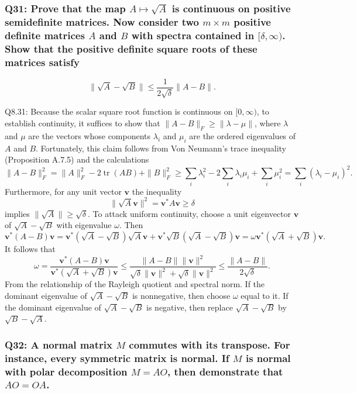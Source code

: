 \documentclass[8pt]{article}
\begin{document}
{\subsubsection*{Q31: Prove that the map \(A \mapsto \sqrt{A}\) is continuous on positive semidefinite matrices. Now consider two \(m \times m\) positive definite matrices \(A\) and \(B\) with spectra contained in \([\delta, \infty)\). Show that the positive definite square roots of these matrices satisfy}

\[ \| \sqrt{A} - \sqrt{B} \| \leq \frac{1}{2\sqrt{\delta}} \| A - B \|. \]

Q8.31: Because the scalar square root function is continuous on \([0, \infty)\), to establish continuity, it suffices to show that \(\|A - B\|_F \geq \|\lambda - \mu\|\), where \(\lambda\) and \(\mu\) are the vectors whose components \(\lambda_i\) and \(\mu_i\) are the ordered eigenvalues of \(A\) and \(B\). Fortunately, this claim follows from Von Neumann’s trace inequality (Proposition A.7.5) and the calculations
\[
\|A - B\|_F^2 = \|A\|_F^2 - 2 \operatorname{tr}(AB) + \|B\|_F^2 \geq \sum_i \lambda_i^2 - 2 \sum_i \lambda_i \mu_i + \sum_i \mu_i^2 = \sum_i (\lambda_i - \mu_i)^2.
\]
Furthermore, for any unit vector \(\mathbf{v}\) the inequality
\[
\|\sqrt{A}\mathbf{v}\|^2 = \mathbf{v}^*A\mathbf{v} \geq \delta
\]
implies \(\|\sqrt{A}\| \geq \sqrt{\delta}\). To attack uniform continuity, choose a unit eigenvector \(\mathbf{v}\) of \(\sqrt{A} - \sqrt{B}\) with eigenvalue \(\omega\). Then
\[
\mathbf{v}^*(A - B)\mathbf{v} = \mathbf{v}^*(\sqrt{A} - \sqrt{B})\sqrt{A}\mathbf{v} + \mathbf{v}^*\sqrt{B}(\sqrt{A} - \sqrt{B})\mathbf{v} = \omega \mathbf{v}^*(\sqrt{A} + \sqrt{B})\mathbf{v}.
\]
It follows that
\[
\omega = \frac{\mathbf{v}^*(A - B)\mathbf{v}}{\mathbf{v}^*(\sqrt{A} + \sqrt{B})\mathbf{v}} \leq \frac{\|A - B\|\|\mathbf{v}\|^2}{\sqrt{\delta}\|\mathbf{v}\|^2 + \sqrt{\delta}\|\mathbf{v}\|^2} \leq \frac{\|A - B\|}{2\sqrt{\delta}}.
\]
From the relationship of the Rayleigh quotient and spectral norm. If the dominant eigenvalue of \(\sqrt{A} - \sqrt{B}\) is nonnegative, then choose \(\omega\) equal to it. If the dominant eigenvalue of \(\sqrt{A} - \sqrt{B}\) is negative, then replace \(\sqrt{A} - \sqrt{B}\) by \(\sqrt{B} - \sqrt{A}\).

\subsubsection*{Q32: A normal matrix \(M\) commutes with its transpose. For instance, every symmetric matrix is normal. If \(M\) is normal with polar decomposition \(M = AO\), then demonstrate that \(AO = OA\).}

}
\end{document}

